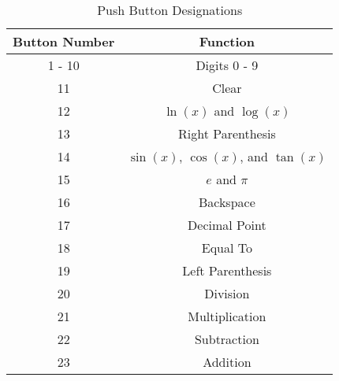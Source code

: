 \begin{table}[htbp]
\centering
\caption{Push Button Designations}
\label{tab:functions}
\small %
\begin{tabular}{cc}
\toprule
Button Number & Function \\
\midrule
1 - 10 & Digits 0 - 9 \\
11 & Clear \\
12 & $\ln{(x)}$ and $\log{(x)}$ \\
13 & Right Parenthesis \\
14 & $\sin{(x)}$, $\cos{(x)}$, and $\tan{(x)}$ \\
15 & $e$ and $\pi$ \\
16 & Backspace \\
17 & Decimal Point \\
18 & Equal To \\
19 & Left Parenthesis \\
20 & Division \\
21 & Multiplication \\
22 & Subtraction \\
23 & Addition \\
\bottomrule
\end{tabular}
\end{table}

